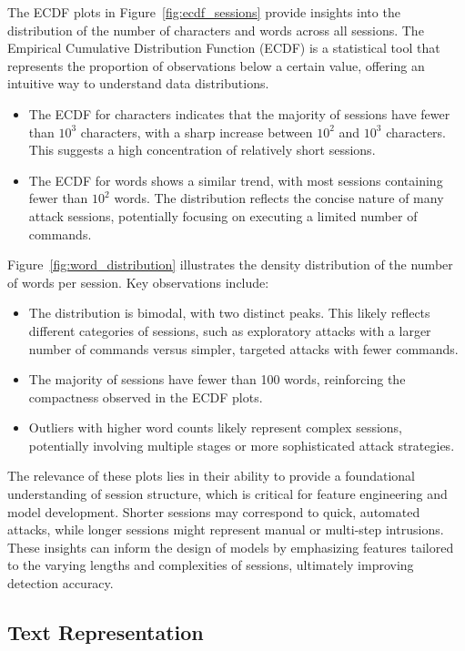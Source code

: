         The ECDF plots in Figure~\ref{fig:ecdf_sessions} provide insights into the distribution of the number of characters and words across all sessions. The Empirical Cumulative Distribution Function (ECDF) is a statistical tool that represents the proportion of observations below a certain value, offering an intuitive way to understand data distributions.
        \begin{itemize}
            \item The ECDF for characters indicates that the majority of sessions have fewer than $10^3$ characters, with a sharp increase between $10^2$ and $10^3$ characters. This suggests a high concentration of relatively short sessions.
            \item The ECDF for words shows a similar trend, with most sessions containing fewer than $10^2$ words. The distribution reflects the concise nature of many attack sessions, potentially focusing on executing a limited number of commands.
        \end{itemize}

        Figure~\ref{fig:word_distribution} illustrates the density distribution of the number of words per session. Key observations include:
        \begin{itemize}
            \item The distribution is bimodal, with two distinct peaks. This likely reflects different categories of sessions, such as exploratory attacks with a larger number of commands versus simpler, targeted attacks with fewer commands.
            \item The majority of sessions have fewer than 100 words, reinforcing the compactness observed in the ECDF plots.
            \item Outliers with higher word counts likely represent complex sessions, potentially involving multiple stages or more sophisticated attack strategies.
        \end{itemize}

        The relevance of these plots lies in their ability to provide a foundational understanding of session structure, which is critical for feature engineering and model development. Shorter sessions may correspond to quick, automated attacks, while longer sessions might represent manual or multi-step intrusions. These insights can inform the design of models by emphasizing features tailored to the varying lengths and complexities of sessions, ultimately improving detection accuracy.

    \subsection{Text Representation}

